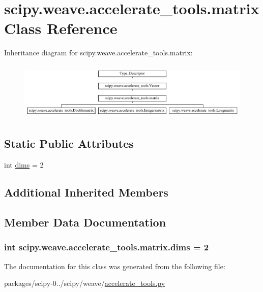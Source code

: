 \hypertarget{classscipy_1_1weave_1_1accelerate__tools_1_1matrix}{}\section{scipy.\+weave.\+accelerate\+\_\+tools.\+matrix Class Reference}
\label{classscipy_1_1weave_1_1accelerate__tools_1_1matrix}
Inheritance diagram for scipy.\+weave.\+accelerate\+\_\+tools.\+matrix\+:\begin{figure}[H]
\begin{center}
\leavevmode
\includegraphics[height=2.817610cm]{classscipy_1_1weave_1_1accelerate__tools_1_1matrix}
\end{center}
\end{figure}
\subsection*{Static Public Attributes}
\begin{DoxyCompactItemize}
\item 
int \hyperlink{classscipy_1_1weave_1_1accelerate__tools_1_1matrix_a5f2e639abfdbb8fc1ea0e26f71251287}{dims} = 2
\end{DoxyCompactItemize}
\subsection*{Additional Inherited Members}


\subsection{Member Data Documentation}
\hypertarget{classscipy_1_1weave_1_1accelerate__tools_1_1matrix_a5f2e639abfdbb8fc1ea0e26f71251287}{}
\subsubsection[{dims}]{\setlength{\rightskip}{0pt plus 5cm}int scipy.\+weave.\+accelerate\+\_\+tools.\+matrix.\+dims = 2\hspace{0.3cm}{\ttfamily [static]}}\label{classscipy_1_1weave_1_1accelerate__tools_1_1matrix_a5f2e639abfdbb8fc1ea0e26f71251287}


The documentation for this class was generated from the following file\+:\begin{DoxyCompactItemize}
\item 
packages/scipy-\/0../scipy/weave/\hyperlink{accelerate__tools_8py}{accelerate\+\_\+tools.\+py}\end{DoxyCompactItemize}
